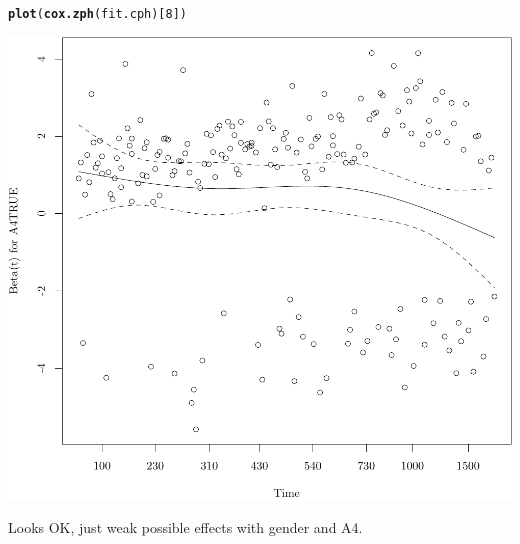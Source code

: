 \documentclass{article}\usepackage[]{graphicx}\usepackage[]{color}
\makeatletter
\def\maxwidth{ %
  \ifdim\Gin@nat@width>\linewidth
    \linewidth
  \else
    \Gin@nat@width
  \fi
}
\newcommand{\hlnum}[1]{\textcolor[rgb]{0.686,0.059,0.569}{#1}}%
\newcommand{\hlstd}[1]{\textcolor[rgb]{0.345,0.345,0.345}{#1}}%
\newcommand{\hlkwd}[1]{\textcolor[rgb]{0.737,0.353,0.396}{\textbf{#1}}}%
\newenvironment{kframe}{%
 \def\at@end@of@kframe{}%
 \ifinner\ifhmode%
  \def\at@end@of@kframe{\end{minipage}}%
  \begin{minipage}{\columnwidth}%
 \fi\fi%
 \def\FrameCommand##1{\hskip\@totalleftmargin \hskip-\fboxsep
 \colorbox{shadecolor}{##1}\hskip-\fboxsep
     \hskip-\linewidth \hskip-\@totalleftmargin \hskip\columnwidth}%
 \MakeFramed {\advance\hsize-\width
   \@totalleftmargin\z@ \linewidth\hsize
   \@setminipage}}%
 {\par\unskip\endMakeFramed%
 \at@end@of@kframe}
\newenvironment{knitrout}{}{} %
\makeatother
\begin{document}
\begin{knitrout}
{}


\begin{kframe}\begin{alltt}
\hlkwd{plot}\hlstd{(}\hlkwd{cox.zph}\hlstd{(fit.cph)[}\hlnum{8}\hlstd{])}
\end{alltt}
\end{kframe}

{\centering \includegraphics[width=\maxwidth]{figure/05-eda-ph-check-full-2} 

}



\end{knitrout}
Looks OK, just weak possible effects with gender and A4.
\end{document}
